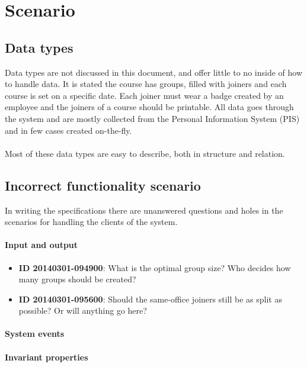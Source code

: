 \documentclass[Main]{subfiles}
\begin{document}
\section{Scenario}


\subsection{Data types}
Data types are not discussed in this document, and offer little to no inside of how to handle data.
It is stated the course has groups, filled with joiners and each course is set on a specific date.
Each joiner must wear a badge created by an employee and the joiners of a course should be printable.
All data goes through the system and are mostly collected from the Personal Information System (PIS) and in few cases created on-the-fly.
\\
\\
Most of these data types are easy to describe, both in structure and relation.



\subsection{Incorrect functionality scenario}
In writing the specifications there are unanswered questions and holes in the scenarios for handling the clients of the system.




\paragraph{Input and output}
\begin{itemize}
\item \textbf{ID 20140301-094900}: What is the optimal group size? 
Who decides how many groups should be created?

\item \textbf{ID 20140301-095600}: Should the same-office joiners still be as split as possible? Or will anything go here?

\end{itemize}




\paragraph{System events}




\paragraph{Invariant properties}
\end{document}
